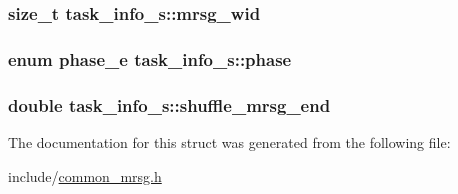 \hypertarget{structtask__info__s_a41aeccbfeb28856a0d06005d3335fe4f}{
\subsubsection[{mrsg\-\_\-wid}]{\setlength{\rightskip}{0pt plus 5cm}size\-\_\-t {\bf task\-\_\-info\-\_\-s\-::mrsg\-\_\-wid}}}\label{structtask__info__s_a41aeccbfeb28856a0d06005d3335fe4f}
\hypertarget{structtask__info__s_afa72d514e04545e1916981f970178902}{
\subsubsection[{phase}]{\setlength{\rightskip}{0pt plus 5cm}enum {\bf phase\-\_\-e} {\bf task\-\_\-info\-\_\-s\-::phase}}}\label{structtask__info__s_afa72d514e04545e1916981f970178902}
\hypertarget{structtask__info__s_aff9b2235fc4e0e475193c0c21cb78866}{
\subsubsection[{shuffle\-\_\-mrsg\-\_\-end}]{\setlength{\rightskip}{0pt plus 5cm}double {\bf task\-\_\-info\-\_\-s\-::shuffle\-\_\-mrsg\-\_\-end}}}\label{structtask__info__s_aff9b2235fc4e0e475193c0c21cb78866}


\-The documentation for this struct was generated from the following file\-:\begin{DoxyCompactItemize}
\item 
include/\hyperlink{common__mrsg_8h}{common\-\_\-mrsg.\-h}\end{DoxyCompactItemize}
